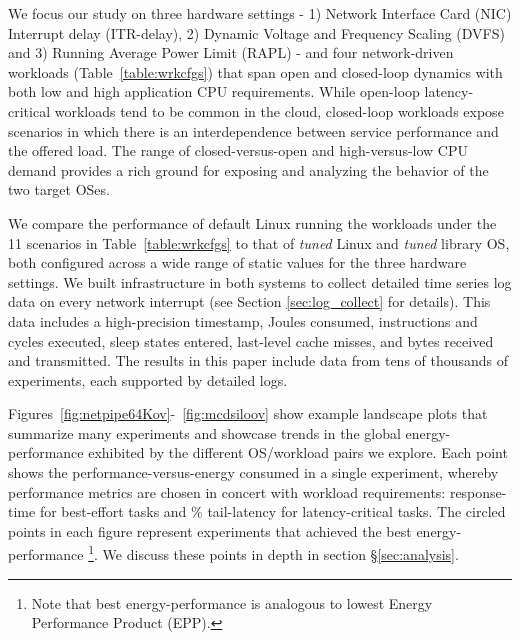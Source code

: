 We focus our study on three hardware settings - 1) Network Interface Card (NIC) Interrupt delay (ITR-delay), 2) Dynamic Voltage and Frequency Scaling (DVFS) and 3) Running Average Power Limit (RAPL) -
and four network-driven workloads (Table~\ref{table:wrkcfgs}) that span open and closed-loop dynamics with both low and high application CPU requirements. 
While open-loop latency-critical workloads tend to be common in the cloud, closed-loop workloads expose scenarios in which there is an interdependence between service performance and the offered load.
The range of closed-versus-open and high-versus-low CPU demand provides a rich ground for exposing and analyzing the behavior of the two target OSes.




We compare the performance of default Linux
running the workloads under the 11 scenarios in Table~\ref{table:wrkcfgs}
to that of {\em tuned} Linux and {\em tuned} library OS,
both configured across a wide range of static values
for the three hardware settings.   
We built infrastructure in both systems to collect detailed time series log data on every network interrupt (see Section \ref{sec:log_collect} for details).
This data includes a high-precision timestamp, Joules consumed, instructions and cycles executed, sleep states entered, last-level cache misses, and bytes received and transmitted.
The results in this paper include data from tens of thousands of experiments, each supported by detailed logs.

Figures~\ref{fig:netpipe64Kov}-~\ref{fig:mcdsiloov}
show example landscape plots that summarize many experiments
and showcase trends in the global energy-performance
exhibited by the different OS/workload pairs we explore.
Each point shows the performance-versus-energy consumed in a single experiment,
whereby performance metrics are chosen
in concert with workload requirements:
response-time for best-effort tasks
and \% tail-latency for latency-critical tasks.
The circled points in each figure
represent experiments that achieved the best energy-performance
\footnote{Note that best energy-performance is analogous to
lowest Energy Performance Product (EPP).}.
We discuss these points in depth in section \S\ref{sec:analysis}.


